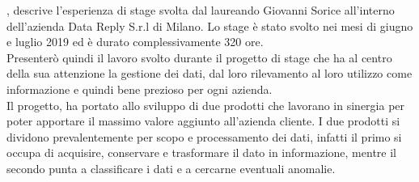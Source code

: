 
, descrive	l'esperienza di stage svolta dal laureando Giovanni Sorice all'interno dell'azienda Data Reply S.r.l di Milano. Lo stage è stato svolto nei mesi di giugno e luglio 2019 ed è durato complessivamente 320 ore.
\\
Presenterò quindi il lavoro svolto durante il progetto di stage che ha al centro della sua attenzione la gestione dei dati, dal loro rilevamento al loro utilizzo come informazione e quindi bene prezioso per ogni azienda.
\\
Il progetto, ha portato allo sviluppo di due prodotti che lavorano in sinergia per poter apportare il massimo valore aggiunto all'azienda cliente.
I due prodotti si dividono prevalentemente per scopo e processamento dei dati, infatti il primo si occupa di acquisire, conservare e trasformare il dato in informazione, mentre il secondo punta a classificare i dati e a cercarne eventuali anomalie.

